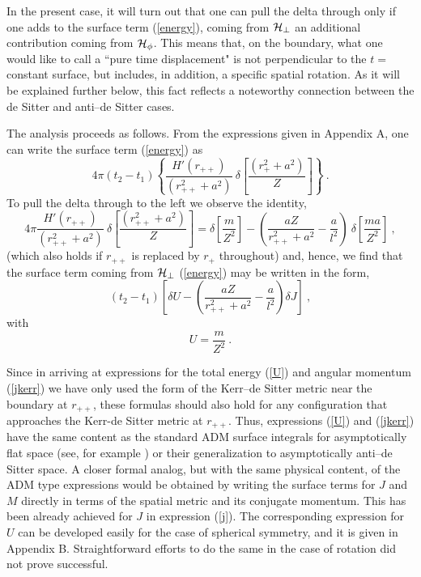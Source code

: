 \documentclass[a4paper,preprintnumbers,amsmath,amssymb]{revtex4}
\begin{document}
In the present case, it will turn out that one can pull the delta through only if one adds
to the surface term (\ref{energy}), coming from ${\cal H}_{\perp}$ an additional contribution coming from ${\cal H}_{\phi}$. This means that, on the boundary, what one would like to call a ``pure time displacement" is not perpendicular to the $t=$constant surface, but includes, in addition, a specific spatial rotation. As it will be explained further below, this fact reflects  a noteworthy connection between the de Sitter and anti--de Sitter cases.

The analysis proceeds as follows. From the expressions given in Appendix A, one can write
the surface term (\ref{energy}) as
\begin{equation}
4\pi(t_2-t_1)\left\{ \frac{H'(r_{++})}{(r_{++}^2+a^2)}\ \delta
\left[\frac{(r_+^2+a^2)}{Z}\right] \right\}
\ . \label{a}
\end{equation}
To pull the delta through to the left we observe the identity,
\begin{equation}
4\pi\frac{H'(r_{++})}{(r_{++}^2+a^2)} \ \delta \left[\frac{(r_{++}^2+a^2)}{Z}\right] =
\delta\left[ \frac{m}{Z^2}\right] - \left( \frac{aZ}{r_{++}^2+a^2} - \frac{a}{l^2} \right) \ \delta \left[\frac{ma}{Z^2}\right] \ ,
\label{identity}
\end{equation}
(which also holds if $r_{++}$ is replaced by $r_+$ throughout)
and, hence, we find that the surface term coming from ${\cal H}_{\perp}$ (\ref{energy})
may be written in the form,
\begin{equation}
(t_2-t_1) \left[\delta U - \left(\frac{aZ}{r_{++}^2+a^2} - \frac{a}{l^2}  \right) \delta J \right] \ ,
\label{s}
\end{equation}
with
\begin{equation}
U = \frac{m}{Z^2} \ .
\label{U}
\end{equation}

Since in arriving at expressions for the total energy (\ref{U}) and angular momentum (\ref{jkerr}) we have only used the form of the
Kerr--de Sitter metric near the boundary at $r_{++}$, these formulas should also hold for any configuration that approaches the
Kerr-de Sitter metric at $r_{++}$. Thus, expressions (\ref{U}) and (\ref{jkerr}) have the same content as the standard ADM surface integrals
for asymptotically flat space (see, for example \cite{RT}) or their generalization to asymptotically anti--de Sitter space\cite{HT}. A closer
formal analog, but with the same physical content,  of the ADM type expressions would be obtained by writing the surface terms for
$J$ and $M$ directly in terms of the spatial metric and its conjugate momentum. This has been already achieved for $J$ in expression (\ref{j}).
The corresponding expression  for $U$ can be developed easily for the case
of spherical symmetry, and it is given in Appendix B. Straightforward efforts to do the same in the case of rotation did not prove successful.
\end{document}

